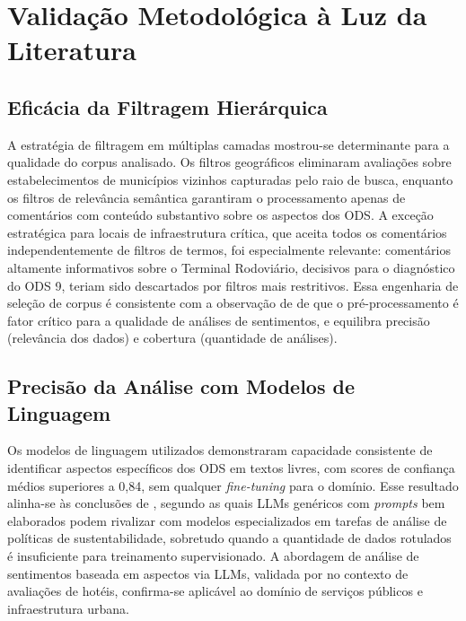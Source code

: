 \section{Validação Metodológica à Luz da Literatura}
\label{sec:disc-validacao-metodologica}

\subsection{Eficácia da Filtragem Hierárquica}
\label{subsec:disc-filtros}

A estratégia de filtragem em múltiplas camadas mostrou-se determinante para a qualidade do corpus analisado. Os filtros geográficos eliminaram avaliações sobre estabelecimentos de municípios vizinhos capturadas pelo raio de busca, enquanto os filtros de relevância semântica garantiram o processamento apenas de comentários com conteúdo substantivo sobre os aspectos dos ODS. A exceção estratégica para locais de infraestrutura crítica, que aceita todos os comentários independentemente de filtros de termos, foi especialmente relevante: comentários altamente informativos sobre o Terminal Rodoviário, decisivos para o diagnóstico do ODS 9, teriam sido descartados por filtros mais restritivos. Essa engenharia de seleção de corpus é consistente com a observação de \citeauthor{wankhade2022} \citeyear{wankhade2022} de que o pré-processamento é fator crítico para a qualidade de análises de sentimentos, e equilibra precisão (relevância dos dados) e cobertura (quantidade de análises).

\subsection{Precisão da Análise com Modelos de Linguagem}
\label{subsec:disc-llm}

Os modelos de linguagem utilizados demonstraram capacidade consistente de identificar aspectos específicos dos ODS em textos livres, com scores de confiança médios superiores a 0,84, sem qualquer \textit{fine-tuning} para o domínio. Esse resultado alinha-se às conclusões de \citeauthor{larosa2025} \citeyear{larosa2025}, segundo as quais LLMs genéricos com \textit{prompts} bem elaborados podem rivalizar com modelos especializados em tarefas de análise de políticas de sustentabilidade, sobretudo quando a quantidade de dados rotulados é insuficiente para treinamento supervisionado. A abordagem de análise de sentimentos baseada em aspectos via LLMs, validada por \citeauthor{agua2025} \citeyear{agua2025} no contexto de avaliações de hotéis, confirma-se aplicável ao domínio de serviços públicos e infraestrutura urbana.

